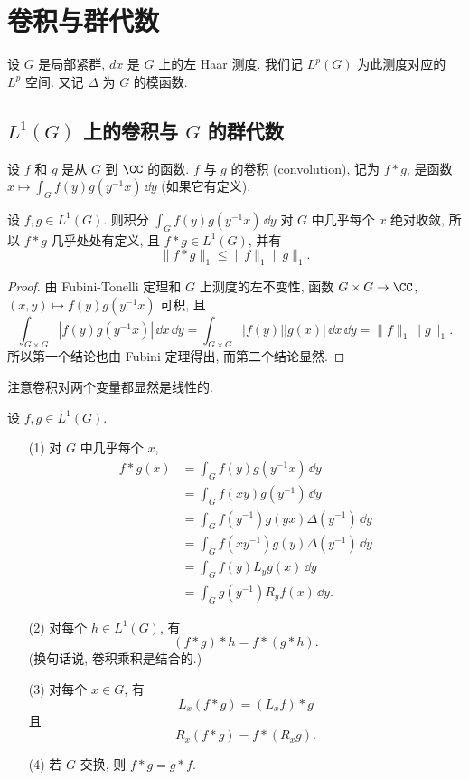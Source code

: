 \section{卷积与群代数}

设 $G$ 是局部紧群, $dx$ 是 $G$ 上的左 Haar 测度. 我们记 $L^p(G)$ 为此测度对应的 $L^p$ 空间. 又记 $\Delta$ 为 $G$ 的模函数.

\subsection{\texorpdfstring{$L^1(G)$ 上的卷积与 $G$ 的群代数}{L^1(G) 上的卷积与 G 的群代数}}

\begin{definition}[卷积 (convolution)]
\label{def:I.4.1.1}
设 $f$ 和 $g$ 是从 $G$ 到 $\CC$ 的函数. $f$ 与 $g$ 的卷积 (convolution), 记为 $f * g$, 是函数 $x \longmapsto \int_G f(y)g(y^{-1}x)\,\dd y$ (如果它有定义).
\end{definition}

\begin{proposition}
\label{prop:I.4.1.2}
设 $f, g \in L^1(G)$. 则积分 $\int_G f(y)g(y^{-1}x)\,\dd y$ 对 $G$ 中几乎每个 $x$ 绝对收敛, 所以 $f * g$ 几乎处处有定义, 且 $f * g \in L^1(G)$, 并有
\[
\|f * g\|_1 \leq \|f\|_1\|g\|_1.
\]
\end{proposition}

\begin{proof}
由 Fubini-Tonelli 定理和 $G$ 上测度的左不变性, 函数 $G \times G \to \CC$, $(x, y) \longmapsto f(y)g(y^{-1}x)$ 可积, 且
\[
\int_{G \times G}|f(y)g(y^{-1}x)|\,\dd x\,\dd y = \int_{G \times G}|f(y)||g(x)|\,\dd x\,\dd y = \|f\|_1\|g\|_1.
\]
所以第一个结论也由 Fubini 定理得出, 而第二个结论显然.
\end{proof}

注意卷积对两个变量都显然是线性的.

\begin{proposition}[卷积的性质]
\label{prop:I.4.1.3}
设 $f, g \in L^1(G)$.
\begin{enumerate}
\item[(1)] 对 $G$ 中几乎每个 $x$,
\begin{align*}
f * g(x) &= \int_G f(y)g(y^{-1}x)\,\dd y \\
&= \int_G f(xy)g(y^{-1})\,\dd y \\
&= \int_G f(y^{-1})g(yx)\Delta(y^{-1})\,\dd y \\
&= \int_G f(xy^{-1})g(y)\Delta(y^{-1})\,\dd y \\
&= \int_G f(y)L_yg(x)\,\dd y \\
&= \int_G g(y^{-1})R_yf(x)\,\dd y.
\end{align*}
\item[(2)] 对每个 $h \in L^1(G)$, 有
\[
(f * g) * h = f * (g * h).
\]
(换句话说, 卷积乘积是结合的.)
\item[(3)] 对每个 $x \in G$, 有
\[
L_x(f * g) = (L_xf) * g
\]
且
\[
R_x(f * g) = f * (R_xg).
\]
\item[(4)] 若 $G$ 交换, 则 $f * g = g * f$.
\end{enumerate}
\end{proposition}

